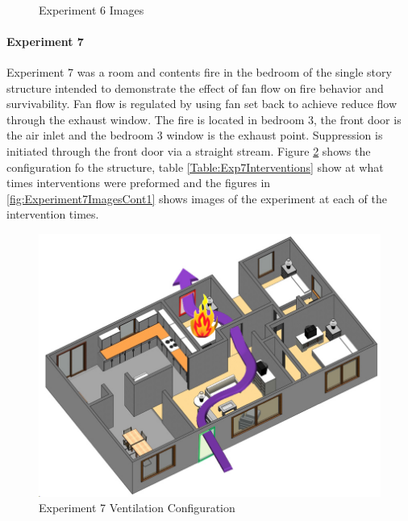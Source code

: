 \documentclass{article}
\begin{document}
\begin{figure}[H]
	\ContinuedFloat 
	\centering 
	 \ 
	\caption{Experiment 6 Images}
	\label{fig:Experiment6ImagesCont4} 
\end{figure}

\paragraph{Experiment 7}\mbox{}

Experiment 7 was a room and contents fire in the bedroom of the single story structure intended to demonstrate the effect of fan flow on fire behavior and survivability. Fan flow is regulated by using fan set back to achieve reduce flow through the exhaust window. The fire is located in bedroom 3, the front door is the air inlet and the bedroom 3 window is the exhaust point. Suppression is initiated through the front door via a straight stream. Figure \ref{fig:Exp7VentConfig} shows the configuration fo the structure, table \ref{Table:Exp7Interventions} show at what times interventions were preformed and the figures in \ref{fig:Experiment7ImagesCont1} shows images of the experiment at each of the intervention times.

\begin{figure}[h!]
	\centering
	\includegraphics[width=5in]{0_Images/FireExperiments/Single_Story/Experiment_7.jpg}
	\caption{Experiment 7 Ventilation Configuration}
	\label{fig:Exp7VentConfig}
\end{figure}
\end{document}
